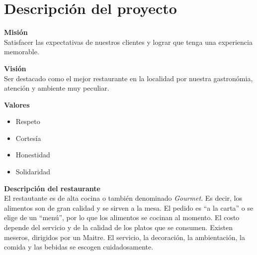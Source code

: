 	\chapter{Descripción del proyecto} \label{Cap: Descripción del proyecto}
	\begin{flushleft}
		\textbf{Misión} \\
		Satisfacer las expectativas de nuestros clientes
		y lograr que tenga una experiencia memorable.
	\end{flushleft}
	\begin{flushleft}
		\textbf{Visión} \\
		Ser destacado como el mejor restaurante en la localidad por nuestra gastronómia, atención y ambiente muy peculiar.
	\end{flushleft}
	\begin{flushleft}
		\textbf{Valores} \\
		\begin{itemize}
			\item Respeto
			\item Cortesía
			\item Honestidad
			\item Solidaridad
		\end{itemize}
	\end{flushleft}
	\textbf{Descripción del restaurante}\\
	El restautante es de alta cocina o también denominado \textit{Gourmet}. Es decir, los alimentos son de gran calidad y se sirven a la mesa. El pedido es “a la carta” o se elige de un “menú”, por lo que los alimentos se cocinan al momento. El costo depende del servicio y de la calidad de los platos que se consumen. Existen meseros, dirigidos por un Maitre. El servicio, la decoración, la ambientación, la comida y las bebidas se escogen cuidadosamente.
